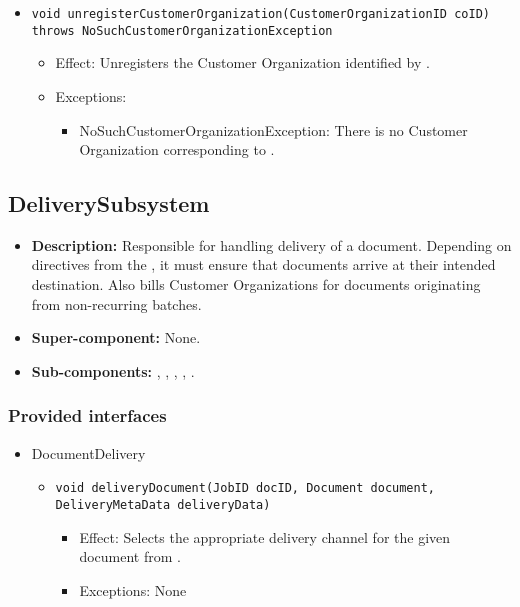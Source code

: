 \begin{itemize}
\begin{itemize}
		\item \texttt{void unregisterCustomerOrganization(CustomerOrganizationID coID) throws NoSuchCustomerOrganizationException}
		    \begin{itemize}
                \item Effect: Unregisters the Customer Organization identified by .
                \item Exceptions:
				\begin{itemize}
					\item NoSuchCustomerOrganizationException: There is no Customer Organization corresponding to .
				\end{itemize}
            \end{itemize}
    \end{itemize}
\end{itemize}

\subsection{DeliverySubsystem}
\begin{itemize}
    \item \textbf{Description:} Responsible for handling delivery of a document. Depending on directives from the , it must ensure that documents arrive at their intended destination. Also bills Customer Organizations for documents originating from non-recurring batches.
    \item \textbf{Super-component:} None.
    \item \textbf{Sub-components:} , , , , .
\end{itemize}

\subsubsection*{Provided interfaces}
\begin{itemize}
    \item DocumentDelivery
    \begin{itemize}
        \item \texttt{void deliveryDocument(JobID docID, Document document, DeliveryMetaData deliveryData)}
        \begin{itemize}
            \item Effect: Selects the appropriate delivery channel for the given document from .
            \item Exceptions: None
        \end{itemize}
    \end{itemize}
\end{itemize}

